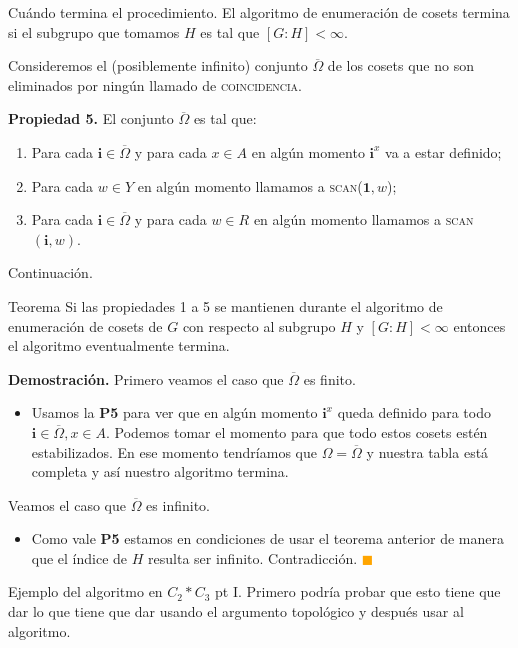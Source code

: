 \documentclass[aspectratio=169, 9pt]{beamer}
\renewcommand\qedsymbol{\textcolor{orange}{$\blacksquare$}}
\newcommand{\coin}{\textsc{coincidencia}}
\newcommand{\scan}{\textsc{scan}}
\newcommand{\ol}{\overline}
\begin{document}
\begin{frame}[fragile]{Cuándo termina el procedimiento.}
	El algoritmo de enumeración de cosets termina si el subgrupo que tomamos $H$ es tal que $[G:H] < \infty$.
	\pause

	Consideremos el (posiblemente infinito) conjunto $\ol \Omega$ de los cosets que no son eliminados por ningún llamado de \coin.

	\pause
	
	\textbf{Propiedad 5.} El conjunto $\ol \Omega$ es tal que:
	\begin{enumerate}
		\item Para cada $\textbf{i} \in \overline \Omega$ y para cada $x \in A$ en algún momento $\textbf{i}^x$ va a estar definido;
		\item Para cada $w \in Y$ en algún momento llamamos a \scan($\textbf{1},w$);
		\item Para cada $\textbf{i} \in \ol \Omega$ y para cada $w \in R$ en algún momento llamamos a \scan$(\textbf{i}, w)$.
	\end{enumerate}
\end{frame}

\begin{frame}[fragile]{Continuación.}
	\begin{alertblock}{Teorema}
		Si las propiedades 1 a 5 se mantienen durante el algoritmo de enumeración de cosets de $G$ con respecto al subgrupo $H$ y $[G:H] < \infty$ entonces el algoritmo eventualmente termina.
	\end{alertblock}
	\pause
	
	\textbf{Demostración.} 
	Primero veamos el caso que $\ol \Omega$ es finito.
	\begin{itemize}
		\pause
		\item Usamos la \textbf{P5} para ver que en algún momento $\textbf{i}^x$ queda definido para todo $\textbf{i} \in \ol\Omega, x \in A$.
		\pause 
		Podemos tomar el momento para que todo estos cosets estén estabilizados.
		\pause
		En ese momento tendríamos que $\Omega = \ol \Omega$ y nuestra tabla está completa y así nuestro algoritmo termina.
	\end{itemize}
	\pause
	Veamos el caso que $\ol \Omega$ es infinito.
	\begin{itemize}
		\pause
		\item Como vale \textbf{P5} estamos en condiciones de usar el teorema anterior de manera que el índice de $H$ resulta ser infinito.
		Contradicción.
		\qedsymbol
	\end{itemize}
		
	
	
\end{frame}

\begin{frame}[fragile]{Ejemplo del algoritmo en $C_2 \ast C_3$ pt I.}
Primero podría probar que esto tiene que dar lo que tiene que dar usando el argumento topológico y después usar al algoritmo.

\end{frame}
\end{document}
